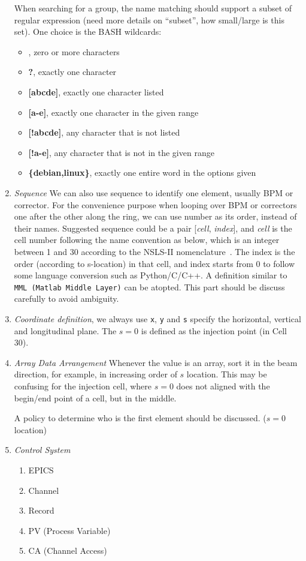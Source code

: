 \documentclass[11pt,oneside,letterpaper,showtrims,article]{memoir}
\newcommand{\code}[1]{\texttt{#1}}
\newcommand{\strong}[1]{{\bfseries #1}}
\begin{document}
\begin{enumerate}
   When searching for a group, the name matching should
  support a subset of regular expression (need more details on ``subset'',
  how small/large is this set). One choice is the BASH wildcards:
  \begin{itemize}
  \item \strong{*}, zero or more characters
  \item \strong{?}, exactly one character
  \item \strong{[abcde]}, exactly one character listed
  \item \strong{[a-e]}, exactly one character in the given range
  \item \strong{[!abcde]}, any character that is not listed
  \item \strong{[!a-e]}, any character that is not in the given range
  \item \strong{\{debian,linux\}}, exactly one entire word in the options
    given
  \end{itemize}
\item \emph{Sequence} We can also use sequence to identify
  one element, usually BPM or corrector. For the convenience purpose when
  looping over BPM or correctors one after the other along the ring, we
  can use number as its order, instead of their names. Suggested sequence
  could be a pair [\emph{cell}, \emph{index}], and \emph{cell} is the cell
  number following the name convention as below, which is an integer
  between 1 and 30 according to the NSLS-II
  nomenclature~\cite{lt_2008_nomenclature,lt_2009_nomenclature}. The index
  is the order (according to s-location) in that cell, and index starts
  from 0 to follow some language conversion such as Python/C/C++. A
  definition similar to \code{MML (Matlab Middle Layer)} can be
  atopted. This part should be discuss carefully to avoid ambiguity.
   
\item \emph{Coordinate definition}, we always use \code{x}, \code{y} and
  \code{s} specify the horizontal, vertical and longitudinal plane. The
  $s=0$ is defined as the injection point (in Cell 30).
\item \emph{Array Data Arrangement} Whenever the value is an
  array, sort it in the beam direction, for example, in increasing order
  of $s$ location. This may be confusing for the injection cell, where
  $s=0$ does not aligned with the begin/end point of a cell, but in the
  middle.

  A policy to determine who is the first element should be
  discussed. ($s=0$ location)

\item \emph{Control System}
\begin{enumerate}
\item EPICS
\item Channel
\item Record
\item PV (Process Variable)
\item CA (Channel Access)
\end{enumerate}
\end{enumerate}
\end{document}
